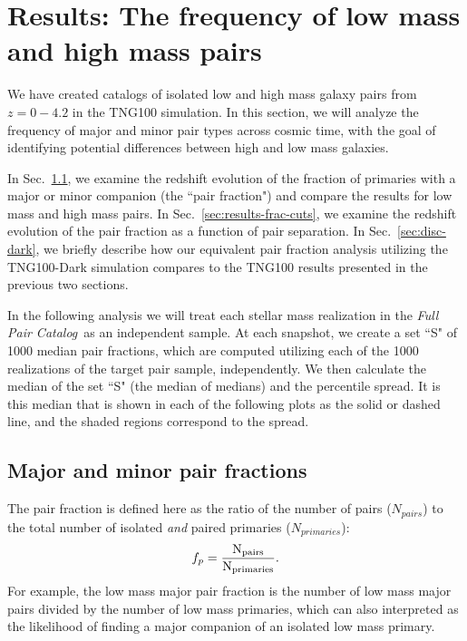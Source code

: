 \documentclass[twocolumn]{aastex631}
\newcommand{\paircat}{\textit{Full Pair Catalog}}
\begin{document}
\section{Results: The frequency of low mass and high mass pairs}
\label{sec:results}

We have created catalogs of isolated low and high mass galaxy pairs from $z=0-4.2$ in the TNG100 simulation. 
In this section, we will analyze the frequency of major and minor pair types across cosmic time, with the goal of identifying potential differences between high and low mass galaxies. 

In Sec.~\ref{sec:results-frac}, we examine the redshift evolution of the fraction of primaries with a major or minor companion (the ``pair fraction") and compare the results for low mass and high mass pairs.
In Sec.~\ref{sec:results-frac-cuts}, we examine the redshift evolution of the pair fraction as a function of pair separation. 
In Sec.~\ref{sec:disc-dark}, we briefly describe how our equivalent pair fraction analysis utilizing the TNG100-Dark simulation compares to the TNG100 results presented in the previous two sections. 

In the following analysis we will treat each stellar mass realization in the \paircat\ as an independent sample. 
At each snapshot, we create a set ``S" of 1000 median pair fractions, which are computed utilizing each of the 1000 realizations of the target pair sample, independently.
We then calculate the median of the set ``S" (the median of medians) and the percentile spread. 
It is this median that is shown in each of the following plots as the solid or dashed line, and the shaded regions correspond to the spread. 

    \subsection{Major and minor pair fractions}\label{sec:results-frac}
    The pair fraction is defined here as the ratio of the number of pairs ($N_{pairs}$) to the total number of isolated \textit{and} paired primaries ($N_{primaries}$):
    $$f_{p}=\rm \frac{N_{pairs}}{N_{primaries}}.$$
    For example, the low mass major pair fraction is the number of low mass major pairs divided by the number of low mass primaries, which can also interpreted as the likelihood of finding a major companion of an isolated low mass primary. 
    
\end{document}
